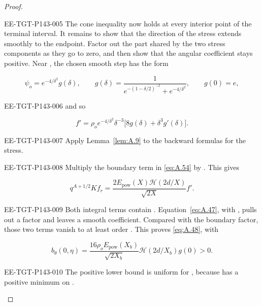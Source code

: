 \begin{proof}
\begin{EESegment}{EE-TGT-P143-005}
The cone inequality now holds at every interior point of the terminal interval. It remains to show that the direction
of the stress extends smoothly to the endpoint. Factor out the part shared by the two stress components as they go to
zero, and then show that the angular coefficient stays positive. Near , the chosen
smooth step has the form
\end{EESegment}
\[
  \psi_o=e^{-4/\delta^2}g(\delta),
  \qquad
  g(\delta)=\frac{1}{e^{-(1-\delta/2)^{-2}}+e^{-4/\delta^2}},
  \qquad g(0)=e,
\]
\begin{EESegment}{EE-TGT-P143-006}
and so
\end{EESegment}
\[
  f'=\rho_oe^{-4/\delta^2}\delta^{-3}\bigl[8g(\delta)+\delta^3g'(\delta)\bigr].
\]
\begin{EESegment}{EE-TGT-P143-007}
Apply Lemma~\ref{lem:A.9} to the backward formulas for the stress.
\end{EESegment}

\begin{EESegment}{EE-TGT-P143-008}
Multiply the boundary term in \eqref{eq:A.54} by . This gives
\end{EESegment}
\[
  q^{A+1/2}Kf_r=\frac{2E_{\mathrm{pow}}(X)\mathcal H(2d/X)}{\sqrt{2X}}f'.
\]
\begin{EESegment}{EE-TGT-P143-009}
Both integral terms contain . Equation~\eqref{eq:A.47}, with
, pulls out a factor  and leaves a smooth
coefficient. Compared with the boundary factor, those two terms vanish to at least order
. This proves \eqref{eq:A.48}, with
\end{EESegment}
\[
  b_\theta(0,\eta)=\frac{16\rho_oE_{\mathrm{pow}}(X_b)}{\sqrt{2X_b}}
  \mathcal H(2d/X_b)g(0)>0.
\]
\begin{EESegment}{EE-TGT-P143-010}
The positive lower bound is uniform for , because
 has a positive minimum on .
\end{EESegment}


\end{proof}
